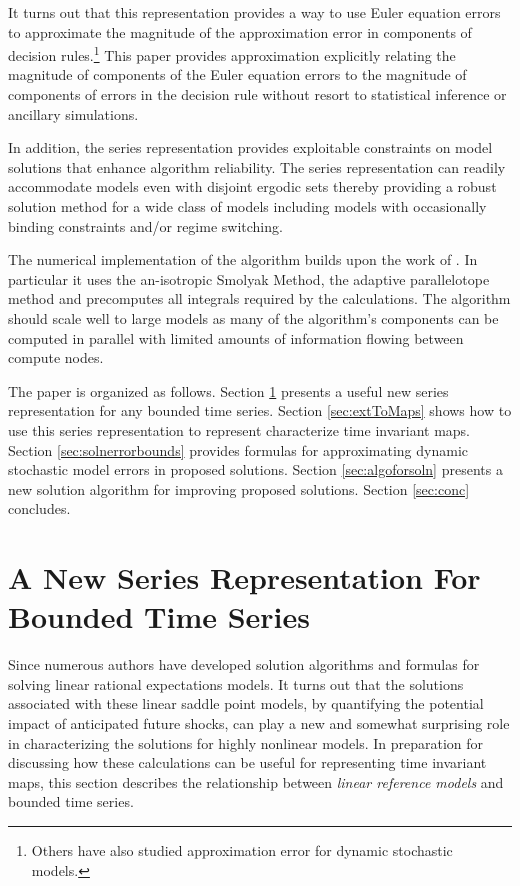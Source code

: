 \documentclass[12pt]{article}
\begin{document}
    It turns out that this representation provides a way to use
    Euler equation errors to
    approximate the magnitude of the    approximation error in components of 
    decision rules.\footnote{    Others have also studied approximation error for dynamic stochastic models\citep{judd2017lower,santos2005accuracy,Santos2000accuracy}.} This paper provides  approximation
    explicitly relating the magnitude of components of the
    Euler equation errors to the magnitude of components of
    errors in the decision rule 
without resort to statistical inference or ancillary simulations.

    In addition, the series representation provides exploitable
    constraints on model solutions that enhance  
    algorithm reliability.
    The series representation can readily accommodate models even with
    disjoint ergodic sets
    thereby providing a robust solution method for a wide class of models including models with occasionally binding constraints and/or regime switching.


The numerical implementation of the algorithm 
builds upon the work of
\citep{juddGSSA2011,JuddIntegrals}.
In particular it uses
the an-isotropic Smolyak Method, the adaptive
parallelotope method\citep{Judd2014}
and precomputes all integrals required by the calculations\citep{JuddIntegrals}.
The algorithm should scale well to large models as many 
of the algorithm's components can be computed in parallel with limited amounts of information flowing between compute nodes.











The paper is organized as follows.
Section \ref{sec:newseries} presents a useful new series representation for any bounded time series.
Section \ref{sec:extToMaps} shows how to use this series representation to represent characterize time invariant maps.
Section \ref{sec:solnerrorbounds} provides formulas for approximating dynamic stochastic model errors in proposed  solutions.
Section \ref{sec:algoforsoln} presents a new solution algorithm for improving proposed solutions.
Section \ref{sec:conc} concludes.

\section{A New Series Representation For  Bounded Time Series}
\label{sec:newseries}
Since \citep{blanchard80} numerous authors have developed solution algorithms and formulas for solving linear rational expectations models.  It turns out that
the solutions associated with these linear 
saddle point models, by quantifying the potential 
impact of anticipated future shocks,
 can play a new and somewhat surprising role 
in characterizing the 
solutions for highly nonlinear models. 
In preparation for
discussing how these calculations can be useful for representing time invariant maps,
this section describes the relationship 
between {\em linear reference models} and bounded time series.
\end{document}
